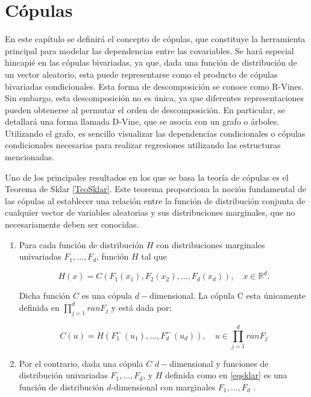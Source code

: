 
\chapter{Cópulas}\label{CapCopulas}

En este capítulo se definirá el concepto de cópulas, que constituye la herramienta principal para modelar las dependencias entre las covariables. Se hará especial hincapié en las cópulas bivariadas, ya que, dada una función de distribución de un vector aleatorio, esta puede representarse como el producto de cópulas bivariadas condicionales. Esta forma de descomposición se conoce como R-Vines. Sin embargo, esta descomposición no es única, ya que diferentes representaciones pueden obtenerse al permutar el orden de descomposición. En particular, se detallará una forma llamada D-Vine, que se asocia con un grafo o árboles. Utilizando el grafo, es sencillo visualizar las dependencias condicionales o cópulas condicionales necesarias para realizar regresiones utilizando las estructuras mencionadas.

Uno de los principales resultados en los que se basa la teoría de cópulas es el Teorema de Sklar \ref{TeoSklar}. Este teorema proporciona la noción fundamental de las cópulas al establecer una relación entre la función de distribución conjunta de cualquier vector de variables aleatorias y sus distribuciones marginales, que no necesariamente deben ser conocidas. 


\begin{teor}\label{TeoSklar}
    \begin{enumerate}
    \item Para cada función de distribución $H$ con distribuciones marginales univariadas $F_1, \dots, F_d$, función $H$ tal que 
    
    \begin{equation}\label{eqsklar}
        H(x) = C(F_1(x_1), F_2(x_2), \dots, F_d(x_d)), \quad x \in \mathbb{R}^{d}.
    \end{equation}

    Dicha función $C$ es una cópula $d-$dimensional. La cópula C esta únicamente definida en $\prod_{j = 1}^{d}ran F_j$ y está dada por:

    \begin{equation}
        C(u) = H(F_1^{\leftarrow}(u_1), \dots, F_d^{\leftarrow}(u_d)), \quad u \in \prod_{j = 1}^{d}ran F_j
    \end{equation}
    
    \item Por el contrario, dada una cópula $C$ $d-$dimensional y funciones de distribución univariadas $F_1, \dots, F_d$, y $H$ definida como en \eqref{eqsklar} es una función de distribución $d$-dimensional con marginales $F_1, \dots, F_d$ \cite{CopulasR}.
    \end{enumerate}
\end{teor}

